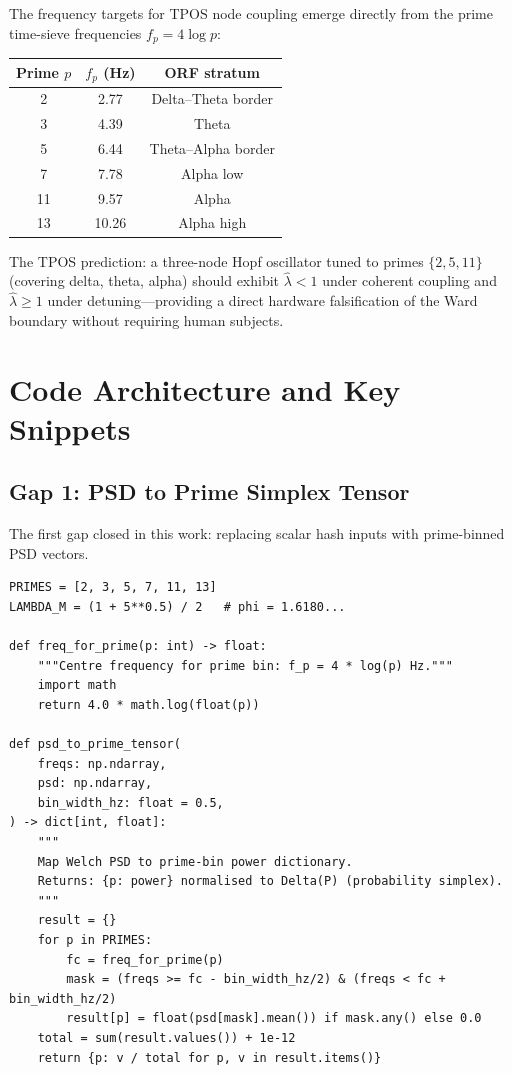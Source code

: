 \documentclass[12pt,a4paper]{article}
\theoremstyle{plain}
\theoremstyle{definition}
\newcommand{\hatlambda}{\hat{\lambda}}
\begin{document}
\noindent The frequency targets for TPOS node coupling emerge directly from the prime
time-sieve frequencies $f_p = 4\log p$:
\begin{center}
\begin{tabular}{@{}ccc@{}}
  \toprule
  Prime $p$ & $f_p$ (Hz) & ORF stratum \\
  \midrule
  2  & 2.77 & Delta--Theta border \\
  3  & 4.39 & Theta \\
  5  & 6.44 & Theta--Alpha border \\
  7  & 7.78 & Alpha low \\
  11 & 9.57 & Alpha \\
  13 & 10.26 & Alpha high \\
  \bottomrule
\end{tabular}
\end{center}

\noindent The TPOS prediction: a three-node Hopf oscillator tuned to primes $\{2,5,11\}$
(covering delta, theta, alpha) should exhibit $\hatlambda < 1$ under coherent coupling
and $\hatlambda \geq 1$ under detuning---providing a direct hardware falsification of
the Ward boundary without requiring human subjects.

\section{Code Architecture and Key Snippets}
\label{sec:code}

\subsection{Gap 1: PSD to Prime Simplex Tensor}
\label{sec:code:gap1}

The first gap closed in this work: replacing scalar hash inputs with prime-binned
PSD vectors.

\begin{lstlisting}[style=orfpython, caption={Gap 1 --- PSD to prime simplex tensor (\texttt{psd\_to\_tensor.py})}]
PRIMES = [2, 3, 5, 7, 11, 13]
LAMBDA_M = (1 + 5**0.5) / 2   # phi = 1.6180...

def freq_for_prime(p: int) -> float:
    """Centre frequency for prime bin: f_p = 4 * log(p) Hz."""
    import math
    return 4.0 * math.log(float(p))

def psd_to_prime_tensor(
    freqs: np.ndarray,
    psd: np.ndarray,
    bin_width_hz: float = 0.5,
) -> dict[int, float]:
    """
    Map Welch PSD to prime-bin power dictionary.
    Returns: {p: power} normalised to Delta(P) (probability simplex).
    """
    result = {}
    for p in PRIMES:
        fc = freq_for_prime(p)
        mask = (freqs >= fc - bin_width_hz/2) & (freqs < fc + bin_width_hz/2)
        result[p] = float(psd[mask].mean()) if mask.any() else 0.0
    total = sum(result.values()) + 1e-12
    return {p: v / total for p, v in result.items()}
\end{lstlisting}
\end{document}
